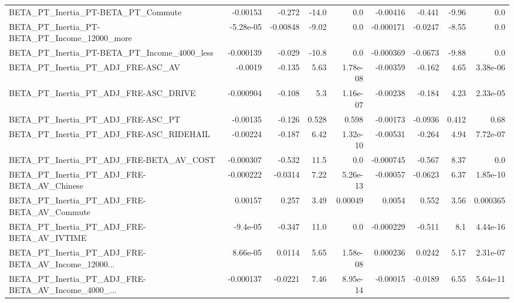 \begin{tabular}{lrrrrrrrr}
BETA\_PT\_Inertia\_PT-BETA\_PT\_Commute                 &    -0.00153 &       -0.272 &    -14.0 &      0.0 &   -0.00416 &      -0.441 &        -9.96 &           0.0 \\
BETA\_PT\_Inertia\_PT-BETA\_PT\_Income\_12000\_more       &   -5.28e-05 &     -0.00848 &    -9.02 &      0.0 &  -0.000171 &     -0.0247 &        -8.55 &           0.0 \\
BETA\_PT\_Inertia\_PT-BETA\_PT\_Income\_4000\_less        &   -0.000139 &       -0.029 &    -10.8 &      0.0 &  -0.000369 &     -0.0673 &        -9.88 &           0.0 \\
BETA\_PT\_Inertia\_PT\_ADJ\_FRE-ASC\_AV                  &     -0.0019 &       -0.135 &     5.63 & 1.78e-08 &   -0.00359 &      -0.162 &         4.65 &      3.38e-06 \\
BETA\_PT\_Inertia\_PT\_ADJ\_FRE-ASC\_DRIVE               &   -0.000904 &       -0.108 &      5.3 & 1.16e-07 &   -0.00238 &      -0.184 &         4.23 &      2.33e-05 \\
BETA\_PT\_Inertia\_PT\_ADJ\_FRE-ASC\_PT                  &    -0.00135 &       -0.126 &    0.528 &    0.598 &   -0.00173 &     -0.0936 &        0.412 &          0.68 \\
BETA\_PT\_Inertia\_PT\_ADJ\_FRE-ASC\_RIDEHAIL            &    -0.00224 &       -0.187 &     6.42 & 1.32e-10 &   -0.00531 &      -0.264 &         4.94 &      7.72e-07 \\
BETA\_PT\_Inertia\_PT\_ADJ\_FRE-BETA\_AV\_COST            &   -0.000307 &       -0.532 &     11.5 &      0.0 &  -0.000745 &      -0.567 &         8.37 &           0.0 \\
BETA\_PT\_Inertia\_PT\_ADJ\_FRE-BETA\_AV\_Chinese         &   -0.000222 &      -0.0314 &     7.22 & 5.26e-13 &   -0.00057 &     -0.0623 &         6.37 &      1.85e-10 \\
BETA\_PT\_Inertia\_PT\_ADJ\_FRE-BETA\_AV\_Commute         &     0.00157 &        0.257 &     3.49 &  0.00049 &     0.0054 &       0.552 &         3.56 &      0.000365 \\
BETA\_PT\_Inertia\_PT\_ADJ\_FRE-BETA\_AV\_IVTIME          &    -9.4e-05 &       -0.347 &     11.0 &      0.0 &  -0.000229 &      -0.511 &          8.1 &      4.44e-16 \\
BETA\_PT\_Inertia\_PT\_ADJ\_FRE-BETA\_AV\_Income\_12000... &    8.66e-05 &       0.0114 &     5.65 & 1.58e-08 &   0.000236 &      0.0242 &         5.17 &      2.31e-07 \\
BETA\_PT\_Inertia\_PT\_ADJ\_FRE-BETA\_AV\_Income\_4000\_... &   -0.000137 &      -0.0221 &     7.46 & 8.95e-14 &   -0.00015 &     -0.0189 &         6.55 &      5.64e-11 \\

\end{tabular}
